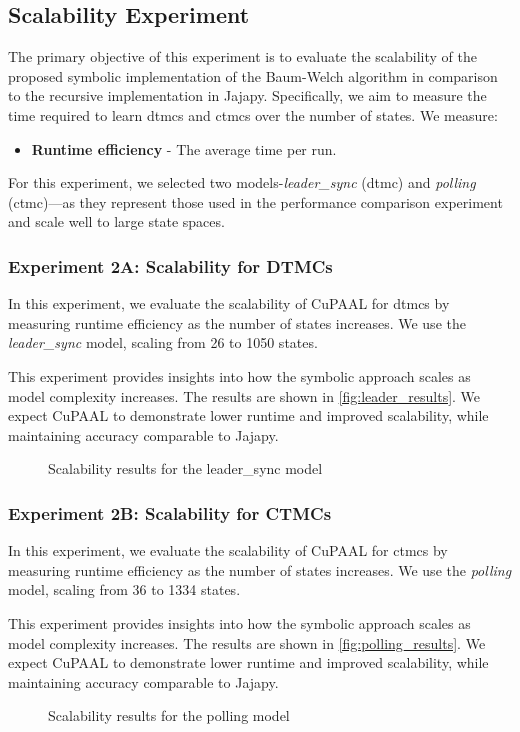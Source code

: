 \subsection{Scalability Experiment}
The primary objective of this experiment is to evaluate the scalability of the proposed symbolic implementation of the Baum-Welch algorithm in comparison to the recursive implementation in Jajapy.
Specifically, we aim to measure the time required to learn \glspl{dtmc} and \glspl{ctmc} over the number of states.
We measure:
\begin{itemize}
    \item \textbf{Runtime efficiency} - The average time per run.
\end{itemize}

For this experiment, we selected two models-\textit{leader\_sync} (\gls{dtmc}) and \textit{polling} (\gls{ctmc})—as they represent those used in the performance comparison experiment and scale well to large state spaces.

\subsubsection{Experiment 2A: Scalability for DTMCs}
In this experiment, we evaluate the scalability of CuPAAL for \glspl{dtmc} by measuring runtime efficiency as the number of states increases.
We use the \textit{leader\_sync} model, scaling from 26 to 1050 states.

This experiment provides insights into how the symbolic approach scales as model complexity increases.
The results are shown in \autoref{fig:leader_results}.
We expect CuPAAL to demonstrate lower runtime and improved scalability, while maintaining accuracy comparable to Jajapy.

\begin{figure}
    \centering
    \caption{Scalability results for the leader\_sync model}
    \label{fig:leader_results}
\end{figure}

\subsubsection{Experiment 2B: Scalability for CTMCs}
In this experiment, we evaluate the scalability of CuPAAL for \glspl{ctmc} by measuring runtime efficiency as the number of states increases.
We use the \textit{polling} model, scaling from 36 to 1334 states.

This experiment provides insights into how the symbolic approach scales as model complexity increases.
The results are shown in \autoref{fig:polling_results}.
We expect CuPAAL to demonstrate lower runtime and improved scalability, while maintaining accuracy comparable to Jajapy.

\begin{figure}
    \centering
    \caption{Scalability results for the polling model}
    \label{fig:polling_results}
\end{figure}

